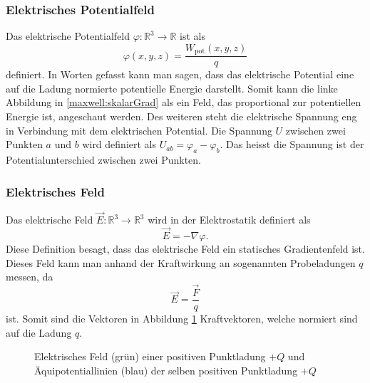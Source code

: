 \subsubsection{Elektrisches Potentialfeld}
Das elektrische Potentialfeld
\(
\varphi:\mathbb{R}^3
\rightarrow
\mathbb{R}
\)
ist als
\begin{equation}
	\varphi(x,y,z)
	=
	\frac{W_{\text{pot}}(x,y,z)}{q}
	\label{maxwell:section:definition_elektrischespotentialfeld}
\end{equation}
definiert.
In Worten gefasst kann man sagen, dass das elektrische Potential eine auf die Ladung normierte potentielle Energie darstellt.
Somit kann die linke Abbildung in \ref{maxwell:skalarGrad} als ein Feld, das proportional zur potentiellen Energie ist, angeschaut werden.
Des weiteren steht die elektrische Spannung eng in Verbindung mit dem elektrischen Potential.
Die Spannung $U$ zwischen zwei Punkten $a$ und $b$ wird definiert als
\(
U_{ab}
=
\varphi_a - \varphi_b.
\)
Das heisst die Spannung ist der Potentialunterschied zwischen zwei Punkten.

\subsubsection{Elektrisches Feld}
Das elektrische Feld
\(
\vec{E}:\mathbb{R}^3 \rightarrow \mathbb{R}^3
\)
wird in der Elektrostatik definiert als
\begin{equation}
	\vec{E}
	=
	- \nabla\varphi.
	\label{maxwell:section:definition_statisch_elektrischesFeld}
\end{equation}
Diese Definition besagt, dass das elektrische Feld ein statisches Gradientenfeld ist.
Dieses Feld kann man anhand der Kraftwirkung an sogenannten Probeladungen $q$ messen, da
\[
\vec{E}
=
\frac{\vec{F}}{q}
\]
ist.
Somit sind die Vektoren in Abbildung \ref{maxwell:section:E-Feld_punktladung} Kraftvektoren, welche normiert sind auf die Ladung $q$.
\begin{figure}
	\centering
	\caption{Elektrisches Feld (grün) einer positiven Punktladung $+Q$ und Äquipotentiallinien (blau) der selben positiven Punktladung $+Q$}
	\label{maxwell:section:E-Feld_punktladung}
\end{figure}


